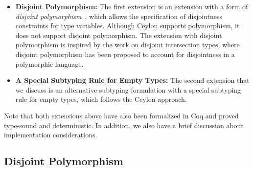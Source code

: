 \begin{itemize}

\item \textbf{Disjoint Polymorphism:} The first extension is an
extension with a form of \emph{disjoint polymorphism}~\citep{alpuimdisjoint}, which allows
the specification of disjointness constraints for type variables. Although Ceylon supports
polymorphism, it does not support disjoint polymorphism. The extension with disjoint
polymorphism is inspired by the work on disjoint intersection types, where disjoint polymorphism
has been proposed to account for disjointness in a polymorphic language.

\item \textbf{A Special Subtyping Rule for Empty Types:}
The second extension that we discuss is an alternative subtyping formulation with
a special subtyping rule for empty types, which follows the Ceylon approach.

\end{itemize}

Note that both extensions above have also been formalized in Coq and proved type-sound
and deterministic. In addition, we also have a brief discussion about implementation considerations.





\subsection{Disjoint Polymorphism}
\label{sec:discussion:poly}

